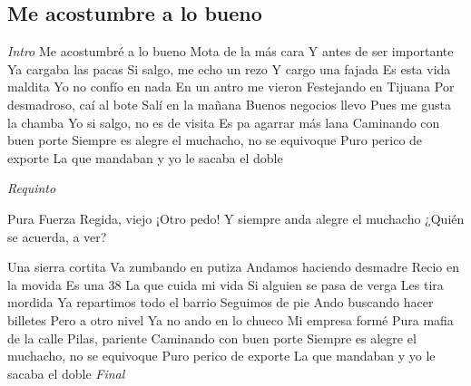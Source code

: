 \subsection{Me acostumbre a lo bueno}
\noindent

\vspace{1cm}

\begin{guitar}
	\begin{multicols}{2}

		\textit{Intro}
	Me acostumbré a lo bueno
	Mota de la más cara
	Y antes de ser importante
	Ya cargaba las pacas
	Si salgo, me echo un rezo
	Y cargo una fajada
	Es esta vida maldita
	Yo no confío en nada
	En un antro me vieron
	Festejando en Tijuana
	Por desmadroso, caí al bote
	Salí en la mañana
	Buenos negocios llevo
	Pues me gusta la chamba
	Yo si salgo, no es de visita
	Es pa agarrar más lana
	Caminando con buen porte
	Siempre es alegre el muchacho, no se equivoque
	Puro perico de exporte
	La que mandaban y yo le sacaba el doble

	\par
	\textit{Requinto}
	\par
	Pura Fuerza Regida, viejo
	¡Otro pedo!
	Y siempre anda alegre el muchacho
	¿Quién se acuerda, a ver?
	\par
	Una sierra cortita
	Va zumbando en putiza
	Andamos haciendo desmadre
	Recio en la movida
	Es una 38
	La que cuida mi vida
	Si alguien se pasa de verga
	Les tira mordida
	Ya repartimos todo el barrio
	Seguimos de pie
	Ando buscando hacer billetes
	Pero a otro nivel
	Ya no ando en lo chueco
	Mi empresa formé
	Pura mafia de la calle
	Pilas, pariente
	Caminando con buen porte
	Siempre es alegre el muchacho, no se equivoque
	Puro perico de exporte
	La que mandaban y yo le sacaba el doble
		\textit{Final}
	\end{multicols}
\end{guitar}
